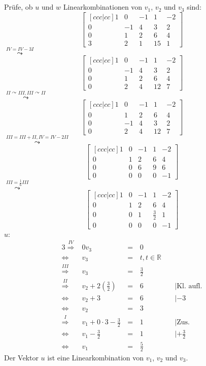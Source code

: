 \documentclass[10pt,a4paper,oneside,ngerman,numbers=noenddot]{scrartcl}
\begin{document}
\section{} %
Prüfe, ob $u$ und $w$ Linearkombinationen von $v_{1}$, $v_{2}$ und $v_{3}$ sind:\\
\[
\begin{bmatrix}[ccc|cc]
1 & 0 & -1 & 1 & -2 \\
0 & -1 & 4 & 3 & 2 \\
0 & 1 & 2 & 6 & 4 \\
3 & 2 & 1 & 15 & 1
\end{bmatrix}
\]
$\overset{IV = IV - 3I}{\leadsto}$
\[
\begin{bmatrix}[ccc|cc]
1 & 0 & -1 & 1 & -2 \\
0 & -1 & 4 & 3 & 2 \\
0 & 1 & 2 & 6 & 4\\
0 & 2 & 4 & 12 & 7
\end{bmatrix}
\]
$\overset{II \curvearrowright III, III \curvearrowright II}{\leadsto}$
\[
\begin{bmatrix}[ccc|cc]
1 & 0 & -1 & 1 & -2 \\
0 & 1 & 2 & 6 & 4\\
0 & -1 & 4 & 3 & 2 \\
0 & 2 & 4 & 12 & 7
\end{bmatrix}
\]
$\overset{III = III + II, IV = IV - 2II}{\leadsto}$
\[
\begin{bmatrix}[ccc|cc]
1 & 0 & -1 & 1 & -2 \\
0 & 1 & 2 & 6 & 4 \\
0 & 0 & 6 & 9 & 6 \\
0 & 0 & 0 & 0 & -1
\end{bmatrix}
\]
$\overset{III = \frac{1}{6}III}{\leadsto}$
\[
\begin{bmatrix}[ccc|cc]
1 & 0 & -1 & 1 & -2 \\
0 & 1 & 2 & 6 & 4 \\
0 & 0 & 1 & \frac{3}{2} & 1 \\
0 & 0 & 0 & 0 & -1
\end{bmatrix}
\]
$u$:\\
\begin{alignat*}{3}
\overset{IV}{\Rightarrow} & 0v_{3} &\,=\,& 0 && \\
\Leftrightarrow & v_{3} &\,=\,& t, t \in \mathbb{R} && \\
\overset{III}{\Rightarrow} & v_{3} &\,=\,& \frac{3}{2} && \\
\overset{II}{\Rightarrow} & v_{2} + 2(\frac{3}{2}) &\,=\,& 6 && \;| \text{Kl. aufl.} \\
\Leftrightarrow & v_{2} + 3 &\,=\,& 6 && \;| -3 \\
\Leftrightarrow & v_{2} &\,=\,& 3 && \\
\overset{I}{\Rightarrow} & v_{1} + 0 \cdot 3 - \frac{3}{2} &\,=\,& 1 && \;| \text{Zus.}\\
\Leftrightarrow & v_{1} - \frac{3}{2} &\,=\,& 1 && \;| + \frac{3}{2} \\
\Leftrightarrow & v_{1} &\,=\,& \frac{5}{2} &&
\end{alignat*}
Der Vektor $u$ ist eine Linearkombination von $v_{1}$, $v_{2}$ und $v_{3}$.
\end{document}
